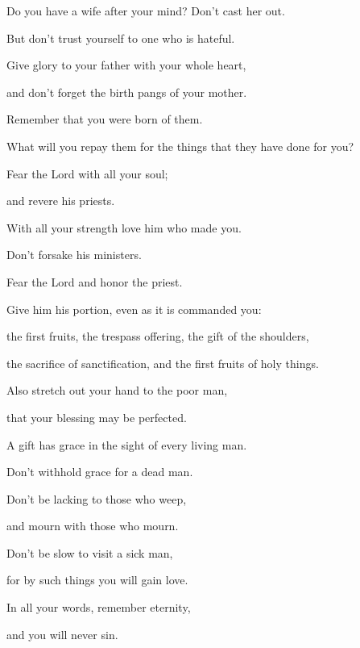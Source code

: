 {\par }{\BB \par }{\Q {}Do you have a wife after your mind? Don’t cast her out.
\par }{\QB {} But don’t trust yourself to one who is hateful.
\par }{\Q {}Give glory to your father with your whole heart,
\par }{\QB and don’t forget the birth pangs of your mother.
\par }{\Q {}Remember that you were born of them.
\par }{\QB What will you repay them for the things that they have done for you?
\par }{\BB \par }{\Q {}Fear the Lord with all your soul;
\par }{\QB and revere his priests.
\par }{\Q {}With all your strength love him who made you.
\par }{\QB Don’t forsake his ministers.
\par }{\Q {}Fear the Lord and honor the priest.
\par }{\QB Give him his portion, even as it is commanded you:
\par }{\QB the first fruits, the trespass offering, the gift of the shoulders,
\par }{\QB the sacrifice of sanctification, and the first fruits of holy things.
\par }{\BB \par }{\Q {}Also stretch out your hand to the poor man,
\par }{\QB that your blessing may be perfected.
\par }{\Q {}A gift has grace in the sight of every living man.
\par }{\QB Don’t withhold grace for a dead man.
\par }{\Q {}Don’t be lacking to those who weep,
\par }{\QB and mourn with those who mourn.
\par }{\Q {}Don’t be slow to visit a sick man,
\par }{\QB for by such things you will gain love.
\par }{\Q {}In all your words, remember eternity,
\par }{\QB and you will never sin.
\par }{\BB \par }
